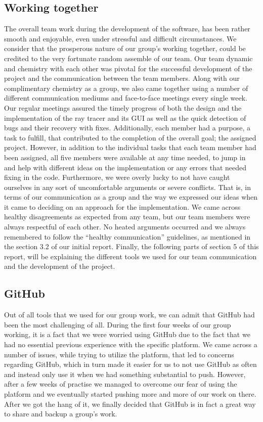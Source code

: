 \documentclass[11pt,a4paper]{article}
\begin{document}
\subsection{ Working together}
The overall team work during the development of the software, has been rather smooth and enjoyable, even under stressful and difficult circumstances. We consider that the prosperous nature of our group’s working together, could be credited to the very fortunate random assemble of our team. Our team dynamic and chemistry with each other was pivotal for the successful development of the project and the communication between the team members. Along with our complimentary chemistry as a group, we also came together using a number of different communication mediums and face-to-face meetings every single week. Our regular meetings assured the timely progress of both the design and the implementation of the ray tracer and its GUI as well as the quick detection of bugs and their recovery with fixes. 
Additionally, each member had a purpose, a task to fulfill, that contributed to the completion of the overall goal; the assigned project. However, in addition to the individual tasks that each team member had been assigned, all five members were available at any time needed, to jump in and help with different ideas on the implementation or any errors that needed fixing in the code. 
Furthermore, we were overly lucky to not have caught ourselves in any sort of uncomfortable arguments or severe conflicts. That is, in terms of our communication as a group and the way we expressed our ideas when it came to deciding on an approach for the implementation. We came across healthy disagreements as expected from any team, but our team members were always respectful of each other. No heated arguments occurred and we always remembered to follow the “healthy communication” guidelines, as mentioned in the section 3.2 of our initial report. 
Finally, the following parts of section 5 of this report, will be explaining the different tools we used for our team communication and the development of the project. 


\subsection{GitHub}
Out of all tools that we used for our group work, we can admit that GitHub had been the most challenging of all. During the first four weeks of our group working, it is a fact that we were worried using GitHub due to the fact that we had no essential previous experience with the specific platform. We came across a number of issues, while trying to utilize the platform, that led to concerns regarding GitHub, which in turn made it easier for us to not use GitHub as often and instead only use it when we had something substantial to push. However, after a few weeks of practise we managed to overcome our fear of using the platform and we eventually started pushing more and more of our work on there. After we got the hang of it, we finally decided that GitHub is in fact a great way to share and backup a group’s work.
\end{document}
